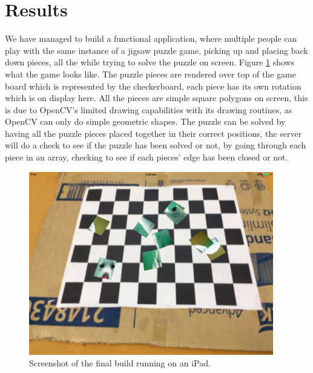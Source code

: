 \documentclass{article}
\begin{document}

\section{Results}

We have managed to build a functional application, where multiple people can
play with the same instance of a jigsaw puzzle game, picking up and placing back
down pieces, all the while trying to solve the puzzle on screen. Figure
\ref{fig:iPadFinal} shows what the game looks like. The puzzle pieces are
rendered over top of the game board which is represented by the checkerboard,
each piece has its own rotation which is on display here. All the pieces are
simple square polygons on screen, this is due to OpenCV's limited drawing
capabilities with its drawing routines, as OpenCV can only do simple geometric
shapes. The puzzle can be solved by having all the puzzle pieces placed together
in their correct positions, the server will do a check to see if the puzzle has
been solved or not, by going through each piece in an array, checking to see if
each pieces' edge has been closed or not.

\begin{figure}[ht]
\begin{center}
\includegraphics[width=0.95\textwidth]{images/iPadFinalImage}
\caption{Screenshot of the final build running on an iPad.}
\label{fig:iPadFinal}
\end{center}
\end{figure}
\end{document}
